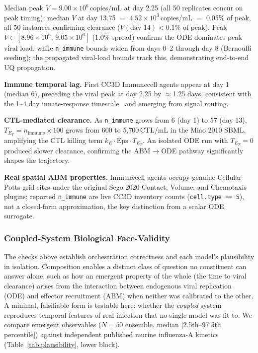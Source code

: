 \documentclass[conference,letterpaper,10pt]{IEEEtran}
\begin{document}
Median peak $V=9.00{\times}10^{6}$\,copies/mL at day 2.25 (all 50
replicates concur on peak timing); median $V$ at day 13.75 $=$
$4.52{\times}10^{3}$\,copies/mL $=$ 0.05\% of peak, all 50 instances
confirming clearance ($V(\text{day 14}) < 0.1\%$ of peak). Peak
$V \in [8.96{\times}10^{6},\,9.05{\times}10^{6}]$ (1.0\% spread) confirms
the ODE dominates peak viral load, while \texttt{n\_immune} bounds widen
from days 0--2 through day 8 (Bernoulli seeding); the propagated viral-load
bounds track this, demonstrating end-to-end UQ propagation.

\textbf{Immune temporal lag.} First CC3D Immunecell agents appear at
day 1 (median 6), preceding the viral peak at day 2.25 by $\approx$1.25
days, consistent with the 1--4 day innate-response
timescale~\cite{iwasaki2010innate} and emerging from signal routing.

\textbf{CTL-mediated clearance.} As \texttt{n\_immune} grows from 6
(day 1) to 57 (day 13), $T_{E_T}\!=\!n_{\text{immune}}\!\times\!100$
grows from 600 to 5{,}700\,CTL/mL in the Miao 2010 SBML, amplifying the
CTL killing term $k_E \cdot \mathrm{Eps} \cdot T_{E_T}$. An isolated ODE
run with $T_{E_T}\!=\!0$ produced slower clearance, confirming the
ABM$\to$ODE pathway significantly shapes the trajectory.

\textbf{Real spatial ABM properties.} Immunecell agents occupy genuine
Cellular Potts grid sites under the original Sego 2020 Contact, Volume, and
Chemotaxis plugins; reported \texttt{n\_immune} are live CC3D inventory
counts (\texttt{cell.type == 5}), not a closed-form approximation, the key
distinction from a scalar ODE surrogate.

\subsubsection{Coupled-System Biological Face-Validity}
\label{sec:coupled-valid}

The checks above establish orchestration correctness and each model's
plausibility in isolation. Composition enables a distinct class of question
no constituent can answer alone, such as how an emergent property of the
whole (the time to viral clearance) arises from the interaction between
endogenous viral replication (ODE) and effector recruitment (ABM) when
neither was calibrated to the other. A minimal, falsifiable form is testable
here: whether the \emph{coupled} system reproduces temporal features of real
infection that no single model was fit to. We compare emergent observables
($N\!=\!50$ ensemble, median [2.5th--97.5th percentile]) against independent
published murine influenza-A kinetics (Table~\ref{tab:plausibility}, lower
block).
\end{document}
